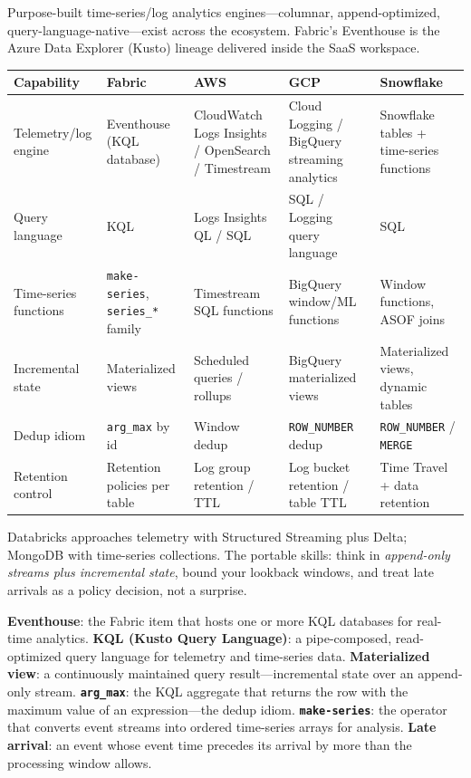 \begin{crosscloud}
Purpose-built time-series/log analytics engines---columnar, append-optimized, query-language-native---exist across the ecosystem. Fabric's Eventhouse is the Azure Data Explorer (Kusto) lineage delivered inside the SaaS workspace.

\vspace{2mm}
{\footnotesize
\begin{tabular}{@{}p{2.8cm}p{3.2cm}p{3.2cm}p{3.2cm}p{3.2cm}@{}}
\toprule
\textbf{Capability} & \textbf{Fabric} & \textbf{AWS} & \textbf{GCP} & \textbf{Snowflake} \\
\midrule
Telemetry/log engine & Eventhouse (KQL database) & CloudWatch Logs Insights / OpenSearch / Timestream & Cloud Logging / BigQuery streaming analytics & Snowflake tables + time-series functions \\
Query language & KQL & Logs Insights QL / SQL & SQL / Logging query language & SQL \\
Time-series functions & \texttt{make-series}, \texttt{series\_*} family & Timestream SQL functions & BigQuery window/ML functions & Window functions, ASOF joins \\
Incremental state & Materialized views & Scheduled queries / rollups & BigQuery materialized views & Materialized views, dynamic tables \\
Dedup idiom & \texttt{arg\_max} by id & Window dedup & \texttt{ROW\_NUMBER} dedup & \texttt{ROW\_NUMBER} / \texttt{MERGE} \\
Retention control & Retention policies per table & Log group retention / TTL & Log bucket retention / table TTL & Time Travel + data retention \\
\bottomrule
\end{tabular}}

\vspace{1mm}
Databricks approaches telemetry with Structured Streaming plus Delta; MongoDB with time-series collections. The portable skills: think in \emph{append-only streams plus incremental state}, bound your lookback windows, and treat late arrivals as a policy decision, not a surprise.
\end{crosscloud}

\begin{keyterms}
\textbf{Eventhouse}: the Fabric item that hosts one or more KQL databases for real-time analytics. \quad
\textbf{KQL (Kusto Query Language)}: a pipe-composed, read-optimized query language for telemetry and time-series data. \quad
\textbf{Materialized view}: a continuously maintained query result---incremental state over an append-only stream. \quad
\textbf{\texttt{arg\_max}}: the KQL aggregate that returns the row with the maximum value of an expression---the dedup idiom. \quad
\textbf{\texttt{make-series}}: the operator that converts event streams into ordered time-series arrays for analysis. \quad
\textbf{Late arrival}: an event whose event time precedes its arrival by more than the processing window allows.
\end{keyterms}

